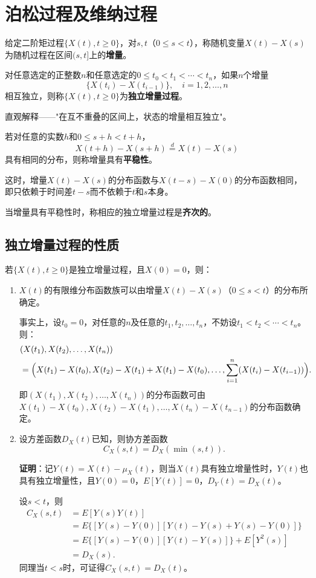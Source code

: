 \documentclass[11pt,a4paper]{report}
\theoremstyle{definition}
\begin{document}
\section{泊松过程及维纳过程}

给定二阶矩过程$\{X(t),t\geq0\}$，对$s,t$（$0\leq s<t$），称随机变量$X(t)-X(s)$为随机过程在区间$(s,t]$上的\textbf{增量}。

对任意选定的正整数$n$和任意选定的$0\leq t_0<t_1<\cdots<t_n$，如果$n$个增量
\[
\{X(t_i)-X(t_{i-1})\},\quad i=1,2,\ldots,n
\]
相互独立，则称$\{X(t),t\geq0\}$为\textbf{独立增量过程}。

直观解释——"在互不重叠的区间上，状态的增量相互独立"。

若对任意的实数$h$和$0\leq s+h<t+h$，
\[
X(t+h)-X(s+h)\stackrel{d}{=}X(t)-X(s)
\]
具有相同的分布，则称增量具有\textbf{平稳性}。

这时，增量$X(t)-X(s)$的分布函数与$X(t-s)-X(0)$的分布函数相同，即只依赖于时间差$t-s$而不依赖于$t$和$s$本身。

当增量具有平稳性时，称相应的独立增量过程是\textbf{齐次的}。

\subsection{独立增量过程的性质}

若$\{X(t),t\geq0\}$是独立增量过程，且$X(0)=0$，则：

\begin{enumerate}[label=\arabic*.,leftmargin=2em]
    \item $X(t)$的有限维分布函数族可以由增量$X(t)-X(s)$（$0\leq s<t$）的分布所确定。
    
    事实上，设$t_0=0$，对任意的$n$及任意的$t_1,t_2,\ldots,t_n$，不妨设$t_1<t_2<\cdots<t_n$。则：
    \begin{align*}
    &(X(t_1),X(t_2),\ldots,X(t_n))\\
    &=\Bigl(X(t_1)-X(t_0),X(t_2)-X(t_1)+X(t_1)-X(t_0),\ldots,\sum_{i=1}^n(X(t_i)-X(t_{i-1}))\Bigr).
    \end{align*}
    即$(X(t_1),X(t_2),\ldots,X(t_n))$的分布函数可由$X(t_1)-X(t_0),X(t_2)-X(t_1),\ldots,X(t_n)-X(t_{n-1})$的分布函数确定。
    
    \item 设方差函数$D_X(t)$已知，则协方差函数
    \[
    C_X(s,t)=D_X(\min(s,t)).
    \]
    
    \textbf{证明}：记$Y(t)=X(t)-\mu_X(t)$，则当$X(t)$具有独立增量性时，$Y(t)$也具有独立增量性，且$Y(0)=0$，$E[Y(t)]=0$，$D_Y(t)=D_X(t)$。
    
    设$s<t$，则
    \begin{align*}
    C_X(s,t)&=E[Y(s)Y(t)]\\
    &=E\{[Y(s)-Y(0)][Y(t)-Y(s)+Y(s)-Y(0)]\}\\
    &=E\{[Y(s)-Y(0)][Y(t)-Y(s)]\}+E[Y^2(s)]\\
    &=D_X(s).
    \end{align*}
    同理当$t<s$时，可证得$C_X(s,t)=D_X(t)$。
\end{enumerate}
\end{document}
